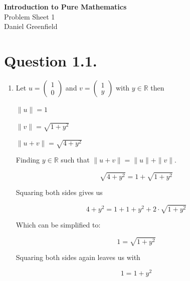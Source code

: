 \documentclass[11pt,a4paper]{article}
\newcommand{\modulename}{Introduction to Pure Mathematics}
\newcommand{\sheetnumber}{1}
\newcommand{\myname}{Daniel Greenfield}
\newcommand{\R}{\mathbb{R}}
\begin{document}
\begin{center}
  {\Large \textbf{\modulename}}\\[0.3em]
  {\large Problem Sheet \sheetnumber}\\[0.3em]
  \myname
\end{center}
\section*{Question 1.1.}

    \begin{enumerate}[label=\alph*.]
        \item  Let $u = \begin{pmatrix} 1 \\ 0 \end{pmatrix}$ and $v = \begin{pmatrix} 1 \\ y\end{pmatrix}$ with $y  \in \R$ then 

            $ \| u \| = 1$

            $\| v \| = \sqrt{1 + y^2}$

            $\| u + v \| = \sqrt{4 + y^2}$

            Finding $ y \in \R $ such that $\| u + v\| = \| u \| + \| v \| $.

            \[
                \sqrt{4 + y^2} = 1 + \sqrt{1 + y^2}
            \]
            
            Squaring both sides gives us
            
            \[
                4 + y^2 = 1 + 1 + y^2 + 2 \cdot \sqrt{1 + y^2}
            \]

            Which can be simplified to:

            \[
                1 = \sqrt{1 + y^2}
            \]

            Squaring both sides again leaves us with
            
            \[
                1 = 1 + y^2
            \]


\end{enumerate}
\end{document}
